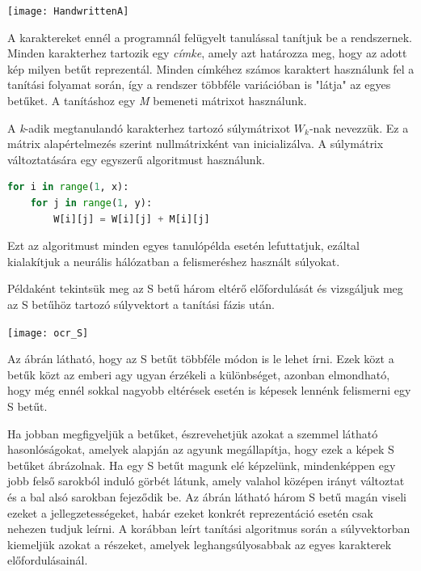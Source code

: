 \begin{center}
	\texttt{[image: HandwrittenA]}
\end{center}

A karaktereket ennél a programnál felügyelt tanulással tanítjuk be a rendszernek. Minden karakterhez tartozik egy \textit{címke}, amely azt határozza meg, hogy az adott kép milyen betűt reprezentál. Minden címkéhez számos karaktert használunk fel a tanítási folyamat során, így a rendszer többféle variációban is "látja" az egyes betűket. A tanításhoz egy \textit{M} bemeneti mátrixot használunk.

A \textit{k}-adik megtanulandó karakterhez tartozó súlymátrixot \(W_k\)-nak nevezzük. Ez a mátrix alapértelmezés szerint nullmátrixként van inicializálva. A súlymátrix változtatására egy egyszerű algoritmust használunk.

\begin{lstlisting}[language=Python]
for i in range(1, x):
	for j in range(1, y):
		W[i][j] = W[i][j] + M[i][j]
\end{lstlisting}

Ezt az algoritmust minden egyes tanulópélda esetén lefuttatjuk, ezáltal kialakítjuk a neurális hálózatban a felismeréshez használt súlyokat.

Példaként tekintsük meg az S betű három eltérő előfordulását és vizsgáljuk meg az S betűhöz tartozó súlyvektort a tanítási fázis után.

\begin{center}
\texttt{[image: ocr\_S]}
\end{center}

Az ábrán látható, hogy az S betűt többféle módon is le lehet írni. Ezek közt a betűk közt az emberi agy ugyan érzékeli a különbséget, azonban elmondható, hogy még ennél sokkal nagyobb eltérések esetén is képesek lennénk felismerni egy S betűt.

Ha jobban megfigyeljük a betűket, észrevehetjük azokat a szemmel látható hasonlóságokat, amelyek alapján az agyunk megállapítja, hogy ezek a képek S betűket ábrázolnak. Ha egy S betűt magunk elé képzelünk, mindenképpen egy jobb felső sarokból induló görbét látunk, amely valahol középen irányt változtat és a bal alsó sarokban fejeződik be. Az ábrán látható három S betű magán viseli ezeket a jellegzetességeket, habár ezeket konkrét reprezentáció esetén csak nehezen tudjuk leírni. A korábban leírt tanítási algoritmus során a súlyvektorban kiemeljük azokat a részeket, amelyek leghangsúlyosabbak az egyes karakterek előfordulásainál.

